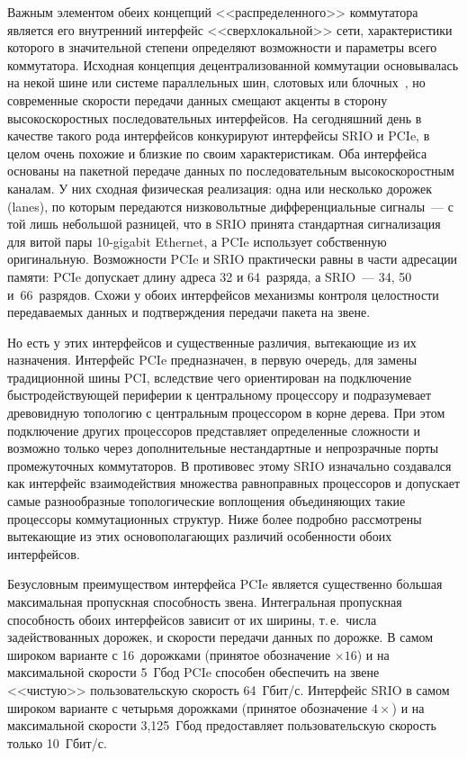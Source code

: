 \begin{multicols}{2}
     Важным элементом обеих концепций <<распределенного>> коммутатора является его 
внутренний интерфейс <<сверхлокальной>> сети, характеристики которого в значительной 
степени определяют возможности и параметры всего коммутатора. Исходная концепция 
децентрализованной коммутации %
основывалась на некой шине или системе параллельных 
шин, слотовых или блочных~\cite{9e}, но совре\-мен\-ные скорости передачи данных смещают %
акценты в сторону высокоскоростных последовательных интерфейсов. На сегодняшний день 
в качестве такого рода интерфейсов конкурируют интерфейсы SRIO и PCIe, в целом очень 
похожие и близкие по своим характеристикам. Оба интерфейса основаны на пакетной 
передаче данных по последовательным высокоскоростным каналам. У них сходная 
физическая реализация: одна или несколько дорожек (lanes), по которым передаются 
низковольтные дифференциальные сигналы~--- с той лишь небольшой разницей, что в SRIO 
принята стандартная сигнализация для витой пары 10-gigabit Ethernet, а PCIe использует 
собственную оригинальную. Возможности PCIe и SRIO практически равны в части 
адресации памяти: PCIe допускает длину адреса 32 и 64~разряда, а SRIO~--- 34, 50 и~66~разрядов. 
Схожи у обоих интерфейсов механизмы контроля целостности передаваемых 
данных и подтверждения передачи пакета на звене.
     
     Но есть у этих интерфейсов и существенные различия, вытекающие из их назначения. 
Интерфейс PCIe предназначен, в первую очередь, для замены традиционной шины PCI, вследствие чего 
ориентирован на подключение быст\-ро\-дей\-ст\-ву\-ющей периферии к центральному процессору 
и подразумевает древовидную топологию с центральным процессором в корне дерева. При 
этом подключение других процессоров представляет определенные сложности и возможно 
только через дополнительные %
 нестан\-дарт\-ные и непрозрачные порты промежуточных 
коммутаторов. В противовес этому SRIO изначально создавался как интерфейс 
взаимодействия множества равноправных процессоров и допус\-ка\-ет самые разнообразные 
топологические воплощения объединяющих такие процессоры %
 коммутационных структур. 
Ниже более подробно рассмотрены вытекающие из этих осново\-по\-ла\-га\-ющих различий 
особенности обоих интерфейсов.
     
     Безусловным преимуществом интерфейса PCIe является существенно 
б$\acute{\mbox{о}}$льшая максимальная пропускная способность звена. Интегральная 
пропускная способность обоих интерфейсов зависит от их ширины, т.\,е.\ числа 
задействованных дорожек, и скорости передачи данных по дорожке. В самом широком 
варианте с 16~дорожками (принятое обозначение $\times 16$) и на максимальной скорости 
5~Гбод PCIe способен обеспечить на звене <<чистую>> пользовательскую скорость 
64~Гбит/с. Интерфейс SRIO в самом широком варианте с четырьмя дорожками (принятое 
обозначение $4\times$) и на максимальной скорости 3,125~Гбод предоставляет 
пользовательскую скорость только 10~Гбит/с.
     

\end{multicols}
